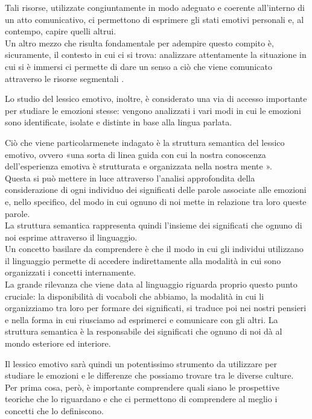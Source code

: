 Tali risorse, utilizzate congiuntamente in modo adeguato e coerente all'interno di un atto comunicativo, ci permettono di esprimere gli stati emotivi personali e, al contempo, capire quelli altrui.\\ 
Un altro mezzo che risulta fondamentale per adempire questo compito è, sicuramente, il contesto in cui ci si trova: analizzare attentamente la situazione in cui si è immersi ci permette di dare un senso a ciò che viene comunicato attraverso le risorse segmentali \parencite{parlato_emotivo}.  

Lo studio del lessico emotivo, inoltre, è considerato una via di accesso importante per studiare le emozioni stesse: vengono analizzati i vari modi in cui le emozioni sono identificate, isolate e distinte in base alla lingua parlata.

Ciò che viene particolarmenete indagato è la struttura semantica del lessico emotivo, ovvero «una sorta di linea guida con cui la nostra conoscenza dell'esperienza emotiva è strutturata e organizzata nella nostra mente \parencite{Sini}».\\
Questa si può mettere in luce attraverso l'analisi approfondita della considerazione di ogni individuo dei significati delle parole associate alle emozioni e, nello specifico, del modo in cui ognuno di noi mette in relazione tra loro queste parole. \\
La struttura semantica rappresenta quindi l'insieme dei significati che ognuno di noi esprime attraverso il linguaggio.\\
Un concetto basilare da comprendere è che il modo in cui gli individui utilizzano il linguaggio permette di accedere indirettamente alla modalità in cui sono organizzati i concetti internamente. \\
La grande rilevanza che viene data al linguaggio riguarda proprio questo punto cruciale: la disponibilità di vocaboli che abbiamo, la modalità in cui li organizziamo tra loro per formare dei significati, si traduce poi nei nostri pensieri e nella forma in cui riusciamo ad esprimerci e comunicare con gli altri. La struttura semantica  è la responsabile dei significati che ognuno di noi dà al mondo esteriore ed interiore. 

Il lessico emotivo sarà quindi un potentissimo strumento da utilizzare per studiare le emozioni e le differenze che possiamo trovare tra le diverse culture.\\
Per prima cosa, però, è importante comprendere quali siano le prospettive teoriche che lo riguardano e che ci permettono di comprendere al meglio i concetti che lo definiscono.

